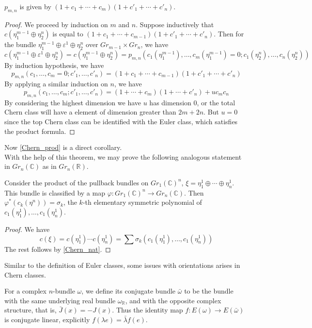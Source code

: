 	\begin{lemma}
		$p_{m,n}$ is given by $(1+c_1+\cdots+c_m)(1+c'_1+\cdots+c'_n)$. 
	\end{lemma}
	\begin{proof}
		We proceed by induction on $m$ and $n$. Suppose inductively that $c(\eta_1^{m-1}\oplus\eta_2^n)$ is equal to $(1+c_1+\cdots+c_{m-1})(1+c'_1+\cdots+c'_n)$. Then for the bundle $\eta_1^{m-1}\oplus\varepsilon^1\oplus\eta_2^n$ over $Gr_{m-1}\times Gr_n$, we have 
		\[ c(\eta_1^{m-1}\oplus\varepsilon^1\oplus\eta_2^n)=c(\eta_1^{m-1}\oplus\eta_2^n)=p_{m,n}(c_1(\eta_1^{m-1}),\dots,c_m(\eta_1^{m-1})=0;c_1(\eta_2^n),\dots,c_n(\eta_2^n)) \]
		By induction hypothesis, we have 
		\[ p_{m,n}(c_1,\dots,c_m=0;c'_1,\dots,c'_n)=(1+c_1+\cdots+c_{m-1})(1+c'_1+\cdots+c'_n) \]
		By applying a similar induction on $n$, we have
		\[ p_{m,n}(c_1,\dots,c_m;c'_1,\dots,c'_n)=(1+\cdots+c_m)(1+\cdots+c'_n)+uc_mc_n \]
		By considering the highest dimension we have $u$ has dimension $0$, or the total Chern class will have a element of dimension greater than $2m+2n$. But $u=0$ since the top Chern class can be identified with the Euler class, which satisfies the product formula. 
	\end{proof}
	Now \cref{Chern_prod} is a direct corollary. \\
	With the help of this theorem, we may prove the following analogous statement in $Gr_n(\mathbb{C})$ as in $Gr_n(\mathbb{R})$. 
	\begin{thm}
		Consider the product of the pullback bundles on $Gr_1(\mathbb{C})^n$, $\xi=\eta^1_1\oplus\cdots\oplus\eta^1_n$. This bundle is classified by a map $\varphi:Gr_1(\mathbb{C})^n\to Gr_n(\mathbb{C})$. Then $\varphi^*(c_k(\eta^n))=\sigma_k$, the $k$-th elementary symmetric polynomial of $c_1(\eta^1_1),\dots,c_1(\eta^1_n)$. 
	\end{thm}
	\begin{proof}
		We have 
		\[ c(\xi)=c(\eta^1_1)\cdots c(\eta^1_n)=\sum\sigma_k(c_1(\eta^1_1),\dots,c_1(\eta^1_n)) \]
		The rest follows by \cref{Chern_nat}. 
	\end{proof}

	Similar to the definition of Euler classes, some issues with orientations arises in Chern classes. 
	\begin{defn}
		For a complex $n$-bundle $\omega$, we define its conjugate bundle $\bar{\omega}$ to be the bundle with the same underlying real bundle $\omega_\mathbb{R}$, and with the opposite complex structure, that is, $\bar{J}(x)=-J(x)$. Thus the identity map $f:E(\omega)\to E(\bar{\omega})$ is conjugate linear, explicitly $f(\lambda e)=\bar{\lambda}f(e)$. 
	\end{defn}

